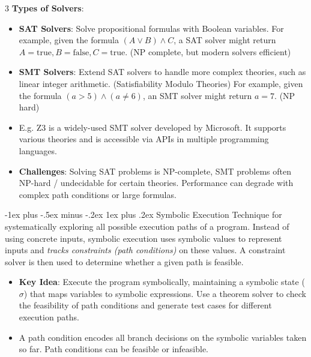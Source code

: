 \documentclass[a4paper, 10pt, landscape]{article}
\makeatletter
\renewcommand{\subsubsection}{\@startsection{subsubsection}{3}{0mm}%
                                {-1ex plus -.5ex minus -.2ex}%
                                {1ex plus .2ex}%
                                {\normalfont\small\bfseries}}
\makeatother
\begin{document}
\begin{multicols*}{3}
\textbf{Types of Solvers}:
\begin{itemize}
\item \textbf{SAT Solvers}: Solve propositional formulas with Boolean variables. For example, given the formula $(A \lor B) \land C$, a SAT solver might return $A = \text{true}, B = \text{false}, C = \text{true}$. (NP complete, but modern solvers efficient)
\item \textbf{SMT Solvers}: Extend SAT solvers to handle more complex theories, such as linear integer arithmetic. (Satisfiability Modulo Theories) For example, given the formula $(a > 5) \land (a \neq 6)$, an SMT solver might return $a = 7$. (NP hard)
\item E.g. Z3 is a widely-used SMT solver developed by Microsoft. It supports various theories and is accessible via APIs in multiple programming languages.
\item \textbf{Challenges}: Solving SAT problems is NP-complete, SMT problems often NP-hard / undecidable for certain theories. Performance can degrade with complex path conditions or large formulas.
\end{itemize}

\subsubsection{Symbolic Execution}
Technique for systematically exploring all possible execution paths of a program. Instead of using concrete inputs, symbolic execution uses symbolic values to represent inputs and \textit{tracks constraints (path conditions)} on these values. A constraint solver is then used to determine whether a given path is feasible.
\begin{itemize}
\item \textbf{Key Idea}: Execute the program symbolically, maintaining a symbolic state ($\sigma$) that maps variables to symbolic expressions. Use a theorem solver to check the feasibility of path conditions and generate test cases for different execution paths.
\item A path condition encodes all branch decisions on the symbolic variables taken so far. Path conditions can be 
feasible or infeasible.


\end{itemize}
\end{multicols*}
\end{document}
